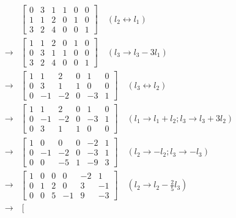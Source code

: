 \begin{align*}
    &\left[\begin{array}{cccccc}
         0 & 3 & 1 & 1 & 0 & 0 \\
         1 & 1 & 2 & 0 & 1 & 0 \\
         3 & 2 & 4 & 0 & 0 & 1
    \end{array}\right] \quad (l_2 \leftrightarrow l_1) \\ \rightarrow
    &\left[\begin{array}{cccccc}
         1 & 1 & 2 & 0 & 1 & 0 \\
         0 & 3 & 1 & 1 & 0 & 0 \\
         3 & 2 & 4 & 0 & 0 & 1
    \end{array}\right]  \quad (l_3 \rightarrow l_3 - 3l_1) \\ \rightarrow
    &\left[\begin{array}{cccccc}
         1 & 1 & 2 & 0 & 1 & 0 \\
         0 & 3 & 1 & 1 & 0 & 0 \\
         0 & -1 & -2 & 0 & -3 & 1
    \end{array}\right] \quad (l_3 \leftrightarrow l_2) \\ \rightarrow
    &\left[\begin{array}{cccccc}
         1 & 1 & 2 & 0 & 1 & 0 \\
         0 & -1 & -2 & 0 & -3 & 1 \\
         0 & 3 & 1 & 1 & 0 & 0  
    \end{array}\right] \quad (l_1 \rightarrow l_1 + l_2; l_3 \rightarrow l_3 + 3l_2) \\ \rightarrow
    &\left[\begin{array}{cccccc}
         1 & 0 & 0 & 0 & -2 & 1 \\
         0 & -1 & -2 & 0 & -3 & 1 \\
         0 & 0 & -5 & 1 & -9 & 3  
    \end{array}\right] \quad (l_2 \rightarrow -l_2; l_3 \rightarrow -l_3) \\ \rightarrow
    &\left[\begin{array}{cccccc}
         1 & 0 & 0 & 0 & -2 & 1 \\
         0 & 1 & 2 & 0 & 3 & -1 \\
         0 & 0 & 5 & -1 & 9 & -3  
    \end{array}\right] \quad (l_2 \rightarrow l_2 - \frac{2}{5}l_3) \\ \rightarrow
    &\left[\begin{array}{cccccc}

\end{array}
\end{align*}
